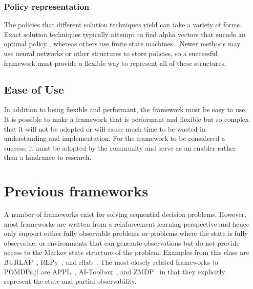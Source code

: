 \subsubsection{Policy representation}

The policies that different solution techniques yield can take a variety of forms.
Exact solution techniques typically attempt to find alpha vectors that encode an optimal policy \cite{kaelbling1998planning,kurniawati2008sarsop}, whereas others use finite state machines \cite{bai2010mcvi}.
Newer methods may use neural networks \cite{karkus2017qmdp} or other structures to store policies, so a successful framework must provide a flexible way to represent all of these structures.

\subsection{Ease of Use}

In addition to being flexible and performant, the framework must be easy to use.
It is possible to make a framework that is performant and flexible but so complex that it will not be adopted or will cause much time to be wasted in understanding and implementation.
For the framework to be considered a success, it must be adopted by the community and serve as an enabler rather than a hindrance to research.

\section{Previous frameworks}

A number of frameworks exist for solving sequential decision problems.
However, most frameworks are written from a reinforcement learning perspective and hence only support either fully observable problems or problems where the state is fully observable, or environments that can generate observations but do not provide access to the Markov state structure of the problem.
Examples from this class are BURLAP~\cite{diuk2008object}, RLPy~\cite{geramifard2015rlpy}, and rllab~\cite{duan2016benchmarking}.
The most closely related frameworks to POMDPs.jl are APPL~\citep{appl}, AI-Toolbox~\citep{aitoolbox}, and ZMDP~\citep{zmdp} in that they explicitly represent the state and partial observability.

